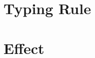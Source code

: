 \documentclass{article}
\begin{document}
\section{Typing Rule}

\section{Effect}
\label{sec:effect}
\end{document}

